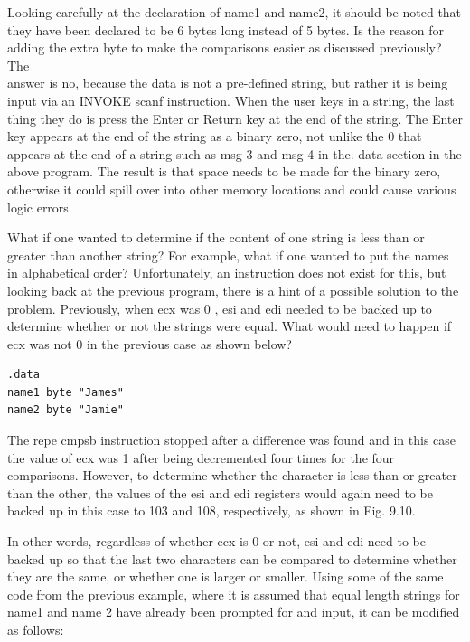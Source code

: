 \documentclass[10pt]{book}
\begin{document}
Looking carefully at the declaration of name1 and name2, it should be noted that they have been declared to be 6 bytes long instead of 5 bytes. Is the reason for adding the extra byte to make the comparisons easier as discussed previously? The\\

answer is no, because the data is not a pre-defined string, but rather it is being input via an INVOKE scanf instruction. When the user keys in a string, the last thing they do is press the Enter or Return key at the end of the string. The Enter key appears at the end of the string as a binary zero, not unlike the 0 that appears at the end of a string such as msg 3 and msg 4 in the. data section in the above program. The result is that space needs to be made for the binary zero, otherwise it could spill over into other memory locations and could cause various logic errors.

What if one wanted to determine if the content of one string is less than or greater than another string? For example, what if one wanted to put the names in alphabetical order? Unfortunately, an instruction does not exist for this, but looking back at the previous program, there is a hint of a possible solution to the problem. Previously, when ecx was 0 , esi and edi needed to be backed up to determine whether or not the strings were equal. What would need to happen if ecx was not 0 in the previous case as shown below?

\begin{verbatim}
.data
name1 byte "James"
name2 byte "Jamie"
\end{verbatim}

The repe cmpsb instruction stopped after a difference was found and in this case the value of ecx was 1 after being decremented four times for the four comparisons. However, to determine whether the character is less than or greater than the other, the values of the esi and edi registers would again need to be backed up in this case to 103 and 108, respectively, as shown in Fig. 9.10.

In other words, regardless of whether ecx is 0 or not, esi and edi need to be backed up so that the last two characters can be compared to determine whether they are the same, or whether one is larger or smaller. Using some of the same code from the previous example, where it is assumed that equal length strings for name1 and name 2 have already been prompted for and input, it can be modified as follows:
\end{document}
